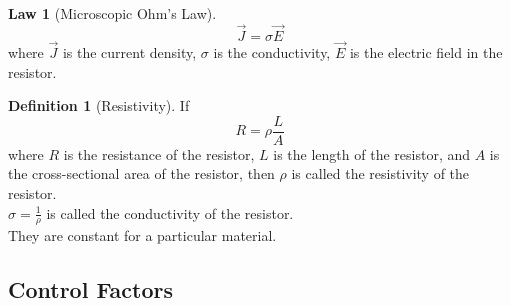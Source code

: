 \documentclass[titlepage, fleqn, a4paper, 12pt, twoside]{article}
\theoremstyle{definition}
\newtheorem{definition}{Definition}
\theoremstyle{theorem}
\newtheorem{law}{Law}
\begin{document}
\begin{law}[Microscopic Ohm's Law]
	\begin{equation*}
		\overrightarrow{J}  = \sigma \overrightarrow{E}
	\end{equation*}
	where $\overrightarrow{J}$ is the current density, $\sigma$ is the conductivity, $\overrightarrow{E}$ is the electric field in the resistor.
	\label{Microscopic_Ohm's_Law}
\end{law}

\begin{definition}[Resistivity]
	If
	\begin{equation*}
		R = \rho \frac{L}{A}
	\end{equation*}
	where $R$ is the resistance of the resistor, $L$ is the length of the resistor, and $A$ is the cross-sectional area of the resistor, then $\rho$ is called the resistivity of the resistor.\\
	$\sigma = \frac{1}{\rho}$ is called the conductivity of the resistor.\\
	They are constant for a particular material.
\end{definition}

\begin{figure}[H]
\end{figure}

\subsection{Control Factors}
\end{document}
